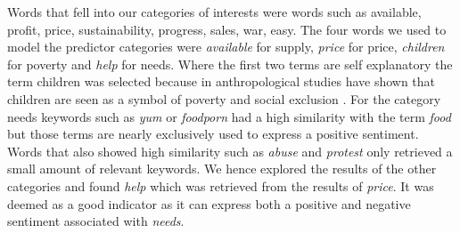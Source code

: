 \documentclass[12pt]{report}
\begin{document}
Words that fell into our categories of interests were words such as available, profit, price, sustainability, progress, sales,  war, easy. The four words we used to model the predictor categories were \emph{available} for supply, \emph{price} for price, \emph{children} for poverty and \emph{help} for needs. Where the first two terms are self explanatory the term children was selected because in \cite{brick02} anthropological studies have shown that children are seen as a symbol of poverty and social exclusion . For the category needs keywords such as \emph{yum} or \emph{foodporn} had a high similarity with the term \emph{food} but those terms are nearly exclusively used to express a positive sentiment. Words that also showed high similarity such as \emph{abuse} and \emph{protest} only retrieved a small amount of relevant keywords. We hence explored the results of the other categories and found \emph{help} which was retrieved from the results of \emph{ price}. It was deemed as a good indicator as it can express both a positive and negative sentiment associated with \emph{needs}.
\end{document}

